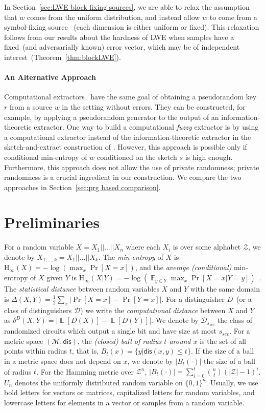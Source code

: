 \documentclass{llncs}
\newcommand{\secref}[1]{\mbox{Section~\ref{#1}}}
\newcommand{\thref}[1]{\mbox{Theorem~\ref{#1}}}
\DeclareMathOperator*{\expe}{\mathbb{E}}
\newcommand{\dis}{\ensuremath{\mathsf{dis}}}
\newcommand{\Hoo}{\mathrm{H}_\infty}
\newcommand{\Hav}{\tilde{\mathrm{H}}_\infty}
\begin{document}
In \secref{sec:LWE block fixing sources}, we are able to relax the assumption that $w$ comes from the uniform distribution, and instead allow $w$ to come from a symbol-fixing source~\cite{KZ07} (each dimension is either uniform or fixed). This relaxation follows from our results about the hardness of LWE when samples have a fixed~(and adversarially known) error vector, which may be of independent interest~(\thref{thm:blockLWE}). 

\paragraph{An Alternative Approach}  Computational extractors~\cite{krawczyk2010cryptographic,barak2011leftover,dachman2012computational} have the same goal of obtaining a pseudorandom key $r$ from a source $w$ in the setting without errors.  They can be constructed, for example, by applying a pseudorandom generator to the output of an information-theoretic extractor.  One way to build a computational \emph{fuzzy} extractor is by using a computational extractor instead  of the information-theoretic extractor in the sketch-and-extract construction of  \cite{DBLP:journals/siamcomp/DodisORS08}.   However, this approach is possible only if conditional min-entropy of $w$ conditioned on the sketch $s$ is high enough.  Furthermore, this approach does not allow the use of private randomness; private randomness is a crucial ingredient in our construction.
We compare the two approaches in \secref{sec:prg based comparison}.

\section{Preliminaries}
\label{sec:preliminaries}
For a random variable $X = X_1||...|| X_n$ where each $X_i$ is over some alphabet $\mathcal{Z}$, we denote by $X_{1,..., k} = X_1||...|| X_k$.  The {\em min-entropy} of $X$ is $\Hoo(X) = -\log(\max_x \Pr[X=x])$, 
and the {\em average (conditional)} min-entropy of $X$ given $Y$ is  $\Hav(X|Y) = -\log(\expe_{y\in Y} \max_{x} \Pr[X=x|Y=y])$~\cite[Section 2.4]{DBLP:journals/siamcomp/DodisORS08}.  
The {\em statistical distance} between random variables $X$ and $Y$ with the same domain is $\Delta(X,Y) = \frac12 \sum_x |\Pr[X=x] - \Pr[Y=x]|$. 
For a distinguisher $D$~(or a class of distinguishers $\mathcal{D}$) we write the \emph{computational distance} between $X$ and $Y$ as $\delta^D(X,Y) = \left| \expe[D(X)]-\expe[D(Y)]\right |$.  We denote by $\mathcal{D}_{s_{sec}}$ the class of randomized circuits which output a single bit and have size at most $s_{sec}$.
For a metric space $(\mathcal{M}, \dis)$, the \emph{(closed) ball of radius $t$ around $x$} is the set of all points within radius $t$, that is, $B_t(x) = \{y| \dis(x, y)\leq t\}$.  If the size of a ball in a metric space does not depend on $x$, we denote by $|B_t(\cdot)|$ the size of a ball of radius $t$.  For the Hamming metric over $\mathcal{Z}^n$, $|B_t(\cdot)| = \sum_{i=0}^t {n \choose t} (|\mathcal{Z}|-1)^i $.  $U_n$ denotes the uniformly  distributed random variable on $\{0,1\}^n$.
Usually, we use bold letters for vectors or matrices, capitalized letters for random variables, and lowercase letters for elements in a vector or samples from a random variable. 
\end{document}
